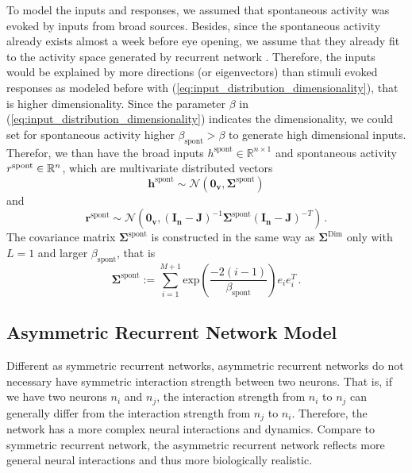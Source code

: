 \documentclass[11pt]{article}
\begin{document}
	To model the inputs and responses, we assumed that spontaneous activity was evoked by inputs from broad sources. Besides, since the spontaneous activity already exists almost a week before eye opening, we assume that they already fit to the activity space generated by recurrent network \cite{tragenap2023nature}. Therefore, the inputs would be explained by more directions (or eigenvectors) than stimuli evoked responses as modeled before with (\ref{eq:input_distribution_dimensionality}), that is higher dimensionality. Since the parameter $\beta$ in (\ref{eq:input_distribution_dimensionality}) indicates the dimensionality, we could set for spontaneous activity higher $\beta_{\text{spont}} > \beta$ to generate high dimensional inputs. 
	Therefor, we than have the broad inputs $h^{\text{spont}} \in \mathbb{R}^{n \times 1}$ and spontaneous activity $r^{\text{spont}} \in \mathbb{R}^{n \time 1}$, which are multivariate distributed vectors 
		\begin{equation}
			\mathbf{h}^{\text{spont}} \sim \mathbf{\mathcal{N}}(\mathbf{0_v}, \mathbf{\Sigma}^{\text{spont}})
		\end{equation}
	and 
		\begin{equation}
			\mathbf{r}^{\text{spont}} \sim \mathbf{\mathcal{N}}\left( \mathbf{0_v}, (\mathbf{I_n} - \mathbf{J})^{-1} \mathbf{\Sigma}^{\text{spont}}(\mathbf{I_n} - \mathbf{J})^{-T}\right) \, .
		\end{equation}
	The covariance matrix $\mathbf{\Sigma}^{\text{spont}}$ is constructed in the same way as $\mathbf{\Sigma}^{\text{Dim}}$ only with $L=1$ and larger $\beta_{\text{spont}}$, that is
		\begin{equation} \label{eq:Sigma_spont}
			\mathbf{\Sigma}^{\text{spont}} := \sum_{i=1}^{M+1} \text{exp}\left(\frac{-2(i-1)}{\beta_{\text{spont}}}\right) e_i e_i^T \, .
		\end{equation}
	
	\clearpage
	\subsection{Asymmetric Recurrent Network Model}
	Different as symmetric recurrent networks, asymmetric recurrent networks do not necessary have symmetric interaction strength between two neurons. That is, if we have two neurons $n_i$ and $n_j$, the interaction strength from $n_i$ to $n_j$ can generally differ from the interaction strength from $n_j$ to $n_i$. Therefore, the network has a more complex neural interactions and dynamics. Compare to symmetric recurrent network, the asymmetric recurrent network reflects more general neural interactions and thus more biologically realistic. 
	
\end{document}
